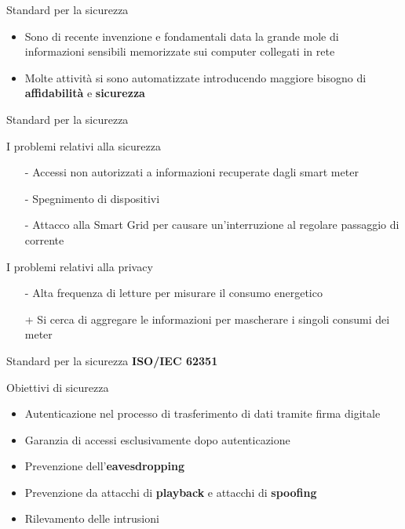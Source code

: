 
\begin{frame}{Standard per la sicurezza}
	\begin{itemize}[<+- | alert@+>]
		\item Sono di recente invenzione e fondamentali data la grande mole di informazioni sensibili memorizzate sui computer collegati in rete
		\item Molte attività si sono automatizzate introducendo maggiore bisogno di \textbf{\color{blue_slides}affidabilità} e \textbf{\color{blue_slides}sicurezza}
	\end{itemize}
\end{frame}

\begin{frame}{Standard per la sicurezza}
	\begin{block}{I problemi relativi alla sicurezza}
	\begin{itemize}
		\item[-] Accessi non autorizzati a informazioni recuperate dagli smart meter
		\item[-] Spegnimento di dispositivi
		\item[-] Attacco alla Smart Grid per causare un'interruzione al regolare passaggio di corrente
	\end{itemize}
	\end{block}		
	\pause
	\begin{block}{I problemi relativi alla privacy}
	\begin{itemize}
		\item[-] Alta frequenza di letture per misurare il consumo energetico
		\item[+] Si cerca di aggregare le informazioni per mascherare i singoli consumi dei meter
	\end{itemize}
	\end{block}		
\end{frame}

\begin{frame}{Standard per la sicurezza}
\textbf{ISO/IEC 62351}
\begin{block}{Obiettivi di sicurezza}
\begin{itemize}[<+- | alert@+>]
	\item Autenticazione nel processo di trasferimento di dati tramite firma digitale
	\item Garanzia di accessi esclusivamente dopo autenticazione
	\item Prevenzione dell'\textbf{\color{blue_slides}eavesdropping}
	\item Prevenzione da attacchi di \textbf{\color{blue_slides}playback} e attacchi di \textbf{\color{blue_slides}spoofing}
	\item Rilevamento delle intrusioni
\end{itemize}
\end{block}
\end{frame}

